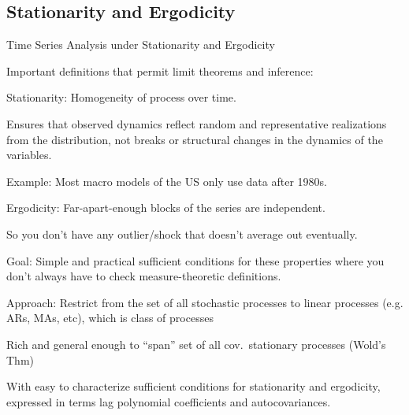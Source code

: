 \documentclass[aspectratio=169, handout]{beamer}
\begin{document}
\subsection{Stationarity and Ergodicity}


{\footnotesize
\begin{frame}{Time Series Analysis under Stationarity and Ergodicity}

Important definitions that permit limit theorems and inference:
\begin{enumerate}
  {\scriptsize
  \item \alert{Stationarity}: {Homogeneity} of process over time.

    Ensures that observed dynamics reflect random and representative
    realizations from the distribution,
    \alert{not breaks} or \alert{structural changes} in the dynamics of
    the variables.

    \pause
    Example: Most macro models of the US only use data after 1980s.

  \pause
  \item \alert{Ergodicity}:
    Far-apart-enough blocks of the series are independent.

    So you don't have any outlier/shock that doesn't
    average out eventually.
  }
\end{enumerate}
\alert{Goal}: Simple and practical \alert{sufficient conditions} for
these properties where you don't always have to check measure-theoretic
definitions.

\pause
\alert{Approach}: {Restrict} from the set of all stochastic processes to
\alert{linear processes} (e.g. ARs, MAs, etc), which is \alert{class} of
processes
\begin{itemize}
  {\scriptsize
  \item Rich and general enough to ``span'' set of all cov.\
    stationary processes (Wold's Thm)
  \item With easy to characterize sufficient conditions for stationarity
    and ergodicity, expressed in terms lag polynomial coefficients and
    autocovariances.
  }
\end{itemize}
\end{frame}
}
\end{document}
